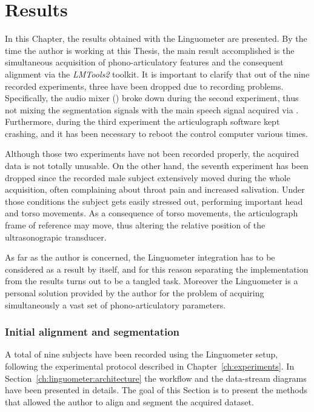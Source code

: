 \chapter{Results}
\label{ch:results}
In this Chapter, the results obtained with the Linguometer are presented.
By the time the author is working at this Thesis, the main result accomplished
is the simultaneous acquisition of phono-articulatory features and the
consequent alignment via the \emph{LMTools2} toolkit.
It is important to clarify that out of the nine recorded experiments, three 
have been dropped due to recording problems.
Specifically, the audio mixer () broke down during the second
experiment, thus not mixing the segmentation signals with the main speech 
signal acquired via .
Furthermore, during the third experiment the articulograph software kept 
crashing, and it has been necessary to reboot the control computer various
times.

Although those two experiments have not been recorded properly, the acquired 
data is not totally unusable.
On the other hand, the seventh experiment has been dropped since the recorded 
male subject extensively moved during the whole acquisition, often complaining
about throat pain and increased salivation.
Under those conditions the subject gets easily stressed out, performing
important head and torso movements.
As a consequence of torso movements, the articulograph frame of reference may
move, thus altering the relative position of the ultrasonograpic transducer.

As far as the author is concerned, the Linguometer integration has to be 
considered as a result by itself, and for this reason separating the
implementation from the results turns out to be a tangled task.
Moreover
the Linguometer is a personal solution provided by the author for the
problem of acquiring simultaneously a vast set of phono-articulatory
parameters.

\subsection{Initial alignment and segmentation}
A total of nine subjects have been recorded using the Linguometer setup,
following the experimental protocol described in Chapter~\ref{ch:experiments}.
In Section~\ref{ch:linguometer:architecture} the workflow and the data-stream
diagrams have been presented in details.
The goal of this Section is to present the methods that allowed the author to
align and segment the acquired dataset.

